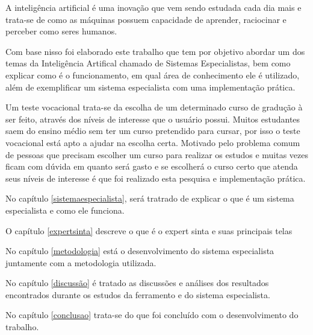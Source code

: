 A inteligência artificial é uma inovação que vem sendo estudada cada dia mais e trata-se de como as máquinas possuem capacidade de aprender, raciocinar e perceber como seres humanos.

Com base nisso foi elaborado este trabalho que tem por objetivo abordar um dos temas da Inteligência Artifical chamado de Sistemas Especialistas, bem como explicar como é o funcionamento, em qual área de conhecimento ele é utilizado, além de exemplificar um sistema especialista com uma implementação prática. 

Um teste vocacional trata-se da escolha de um determinado curso de gradução à ser feito, através dos níveis de interesse que o usuário possui. Muitos estudantes saem do ensino médio sem ter um curso pretendido para cursar, por isso o teste vocacional está apto a ajudar na escolha certa. Motivado pelo problema comum de pessoas que precisam escolher um curso para realizar os estudos e muitas vezes ficam com dúvida em quanto será gasto e se escolherá o curso certo que atenda seus níveis de interesse é que foi realizado esta pesquisa e implementação prática.

No capítulo \ref{sistemaespecialista}, será tratrado de explicar o que é um sistema especialista e como ele funciona.

O capítulo \ref{expertsinta} descreve o que é o expert sinta e suas principais telas

No capítulo \ref{metodologia} está o desenvolvimento do sistema especialista juntamente com a metodologia utilizada.

No capítulo \ref{discussão} é tratado as discussões e análises dos resultados encontrados durante os estudos da ferramento e do sistema especialista.

No capítulo \ref{conclusao} trata-se do que foi concluído com o desenvolvimento do trabalho.